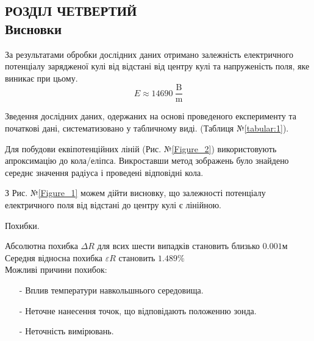 \documentclass[a4paper,12pt]{article}
\begin{document}
	
\newpage
	\begin{center}
		\section* {РОЗДІЛ ЧЕТВЕРТИЙ\\Висновки}
	\end{center}
	
	За результатами обробки дослідних даних отримано залежність електричного потенціалу зарядженої кулі від відстані від центру кулі та напруженість поля, яке виникає при цьому.
	$$E\approx14690\: \dfrac{\textrm{B}}{\textrm{m}}$$
	
	Зведення дослідних даних, одержаних на основі проведеного експерименту та початкові дані, систематизовано у табличному виді. (Таблиця №\ref{tabular:1}).
	
	Для побудови еквіпотенційних ліній (Рис. №\ref{Figure_2}) використовують апроксимацію до кола/еліпса.  Викроставши метод зображень було знайдено середнє значення радіуса і проведені відповідні кола. 
	
	З Рис. №\ref{Figure_1} можем дійти висновку, що залежності потенціалу електричного поля від відстані до центру кулі є лінійною. 
	
	\begin{center}
		Похибки.
	\end{center}
	Абсолютна похибка $\Delta R$ для всих шести випадків становить близько $0.001$м\\
	Середня відносна похибка $\varepsilon R$ становить  $1.489\%$ \\
	Можливі причини похибок:
	\begin{enumerate}
		\item[-] Вплив температури навкольшнього середовища.
		\item[-] Неточне нанесення точок, що відповідають положенню зонда.
		\item[-] Неточність вимірювань.
	\end{enumerate}
	
	
	
	
	
\end{document}
